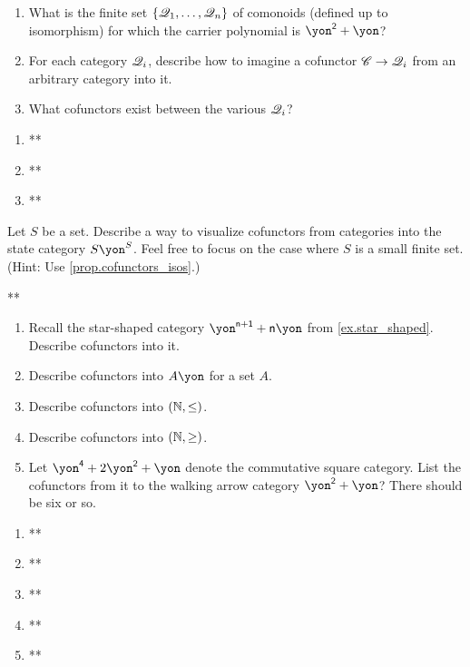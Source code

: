 \documentclass[Book-Poly]{subfiles}
\begin{document}
\begin{exercise}
\begin{enumerate}
	\item What is the finite set $\{\mathscr{Q}_1,\ldots,\mathscr{Q}_n\}$ of comonoids (defined up to isomorphism) for which the carrier polynomial is $\yon^\2+\yon$?
	\item For each category $\mathscr{Q}_i$, describe how to imagine a cofunctor $\mathscr{C}\to\mathscr{Q}_i$ from an arbitrary category into it.
	\item What cofunctors exist between the various $\mathscr{Q}_i$?
\qedhere
\end{enumerate}
\begin{solution}
\begin{enumerate}
    \item **
    \item **
    \item **
\end{enumerate}
\end{solution}
\end{exercise}

\begin{exercise}
Let $S$ be a set. Describe a way to visualize cofunctors from categories into the state category $S\yon^S$. Feel free to focus on the case where $S$ is a small finite set.
(Hint: Use \cref{prop.cofunctors_isos}.)
\begin{solution}
**
\end{solution}
\end{exercise}

\begin{exercise}
\begin{enumerate}
	\item Recall the star-shaped category $\yon^{\ord{n}+\1}+\ord{n}\yon$ from \cref{ex.star_shaped}. Describe cofunctors into it.
	\item Describe cofunctors into $A\yon$ for a set $A$.
	\item Describe cofunctors into $(\mathbb{N},\leq)$.
	\item Describe cofunctors into $(\mathbb{N},\geq)$.
	\item Let $\yon^\4+2\yon^\2+\yon$ denote the commutative square category. List the cofunctors from it to the walking arrow category $\yon^\2+\yon$? There should be six or so.
\qedhere
\end{enumerate}
\begin{solution}
\begin{enumerate}
    \item **
    \item **
    \item **
    \item **
    \item **
\end{enumerate}
\end{solution}
\end{exercise}
\end{document}
